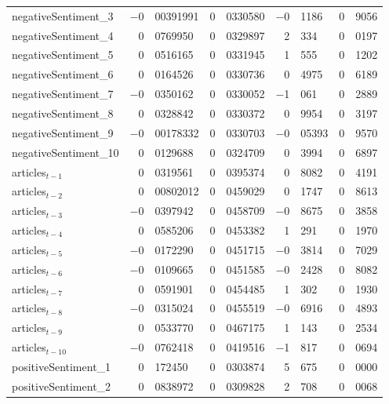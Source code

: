 \begin{center}
\begin{longtable}{lr@{.}lr@{.}lr@{.}lr@{.}l}
negativeSentiment\_3 &
    $-$0&00391991 &
    0&0330580 &
        $-$0&1186 &
        0&9056 \\
negativeSentiment\_4 &
    0&0769950 &
    0&0329897 &
        2&334 &
        0&0197 \\
negativeSentiment\_5 &
    0&0516165 &
    0&0331945 &
        1&555 &
        0&1202 \\
negativeSentiment\_6 &
    0&0164526 &
    0&0330736 &
        0&4975 &
        0&6189 \\
negativeSentiment\_7 &
    $-$0&0350162 &
    0&0330052 &
        $-$1&061 &
        0&2889 \\
negativeSentiment\_8 &
    0&0328842 &
    0&0330372 &
        0&9954 &
        0&3197 \\
negativeSentiment\_9 &
    $-$0&00178332 &
    0&0330703 &
        $-$0&05393 &
        0&9570 \\
negativeSentiment\_10 &
    0&0129688 &
    0&0324709 &
        0&3994 &
        0&6897 \\
articles$_{t-1}$ &
    0&0319561 &
    0&0395374 &
        0&8082 &
        0&4191 \\
articles$_{t-2}$ &
    0&00802012 &
    0&0459029 &
        0&1747 &
        0&8613 \\
articles$_{t-3}$ &
    $-$0&0397942 &
    0&0458709 &
        $-$0&8675 &
        0&3858 \\
articles$_{t-4}$ &
    0&0585206 &
    0&0453382 &
        1&291 &
        0&1970 \\
articles$_{t-5}$ &
    $-$0&0172290 &
    0&0451715 &
        $-$0&3814 &
        0&7029 \\
articles$_{t-6}$ &
    $-$0&0109665 &
    0&0451585 &
        $-$0&2428 &
        0&8082 \\
articles$_{t-7}$ &
    0&0591901 &
    0&0454485 &
        1&302 &
        0&1930 \\
articles$_{t-8}$ &
    $-$0&0315024 &
    0&0455519 &
        $-$0&6916 &
        0&4893 \\
articles$_{t-9}$ &
    0&0533770 &
    0&0467175 &
        1&143 &
        0&2534 \\
articles$_{t-10}$ &
    $-$0&0762418 &
    0&0419516 &
        $-$1&817 &
        0&0694 \\
positiveSentiment\_1 &
    0&172450 &
    0&0303874 &
        5&675 &
        0&0000 \\
positiveSentiment\_2 &
    0&0838972 &
    0&0309828 &
        2&708 &
        0&0068 \\

\end{longtable}
\end{center}
